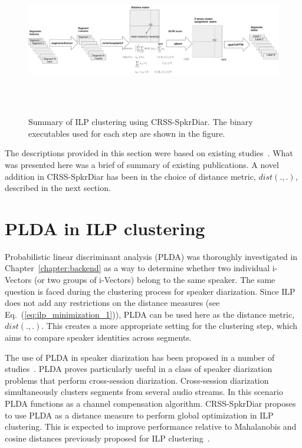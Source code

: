 \begin{figure}[ht!]
	\centering
	\includegraphics[height = 2.6in, width=1\textwidth]{figures/ilp_clustering_summary}
	\caption{ \small Summary of ILP clustering using CRSS-SpkrDiar. The binary executables used for each step are shown in the figure. }
	\label{fig:ch5_ilp_clustering}
	\vspace{-3mm}
\end{figure}


The descriptions provided in this section were based on existing studies~\cite{mueller2010ILP, rouvier2012ilp,dupuy2012ivectorsILP,dupuy2014ILPimprovement}. 
What was presented here was a brief of summary of existing publications. 
A novel addition in CRSS-SpkrDiar has been in the choice of distance metric, $dist(.,.)$, described in the next section. 

\section{PLDA in ILP clustering}
\label{sec:plda_ilp}
Probabilistic linear discriminant analysis (PLDA) was thoroughly investigated in Chapter~\ref{chapter:backend} as a way to determine whether two individual i-Vectors (or two groups of i-Vectors) belong to the same speaker. 
The same question is faced during the clustering process for speaker diarization. 
Since ILP does not add any restrictions on the distance measures (see Eq.~(\ref{eq:ilp_minimization_1})), PLDA can be used here as the distance metric, $dist(.,.)$. 
This creates a more appropriate setting for the clustering step, which aims to compare speaker identities across segments. 

The use of PLDA in speaker diarization has been proposed in a number of studies~\cite{prazak2011PLDAdrz, silovsky2011PLDAdrz, sell2014PLDAdrz}. 
PLDA proves particularly useful in a class of speaker diarization problems that perform cross-session diarization. 
Cross-session diarization simultaneously clusters segments from several audio streams. 
In this scenario PLDA functions as a channel compensation algorithm. 
CRSS-SpkrDiar proposes to use PLDA as a distance measure to perform global optimization in ILP clustering. 
This is expected to improve performance relative to Mahalanobis and cosine distances previously proposed for ILP clustering~\cite{dupuy2012ivectorsILP,dupuy2014ILPimprovement}. 

